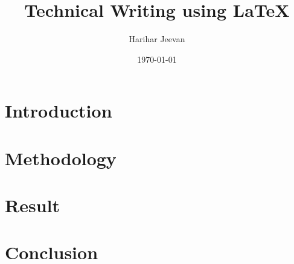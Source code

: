 \documentclass{article}
\begin{document}
	\title{Technical Writing using LaTeX}
	\author{Harihar Jeevan}
	\date{\today}
	\maketitle
	\begin{abstract}
		\lipsum[1]
	\end{abstract}
	\section{Introduction}
		\lipsum[1-2]
	\section{Methodology}
		\lipsum[1]
	\section{Result}
		\lipsum[1]
	\section{Conclusion}
		\lipsum[1]
\end{document}
